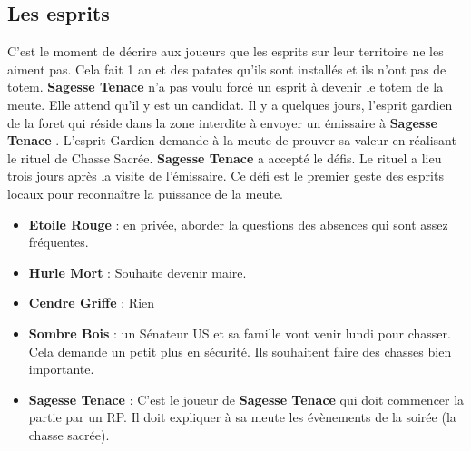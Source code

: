 \documentclass[oneside,12pt]{book}
\newcommand{\Lynn}{\textbf{Etoile Rouge} }
\newcommand{\Jessica}{\textbf{Sagesse Tenace} }
\newcommand{\Luke}{\textbf{Cendre Griffe} }
\newcommand{\Peter}{\textbf{Hurle Mort} }
\newcommand{\Leonard}{\textbf{Sombre Bois} }
\begin{document}
\begin{flushleft}
\subsection{Les esprits}
C'est le moment de décrire aux joueurs que les esprits sur leur territoire ne les aiment pas. Cela fait 1 an et des patates qu'ils sont installés et ils n'ont pas de totem. \Jessica n'a pas voulu forcé un esprit à devenir le totem de la meute. Elle attend qu'il y est un candidat. Il y a quelques jours, l'esprit gardien de la foret qui réside dans la zone interdite à envoyer un émissaire à \Jessica. L'esprit Gardien demande à la meute de prouver sa valeur en réalisant le rituel de Chasse Sacrée. \Jessica a accepté le défis. Le rituel a lieu trois jours après la visite de l'émissaire. Ce défi est le premier geste des esprits locaux pour reconnaître la puissance de la meute. 
\begin{itemize}
\item \Lynn : en privée, aborder la questions des absences qui sont assez fréquentes.
\item \Peter : Souhaite devenir maire.
\item \Luke : Rien
\item \Leonard : un Sénateur US et sa famille vont venir lundi pour chasser. Cela demande un petit plus en sécurité. Ils souhaitent faire des chasses bien importante. 
\item \Jessica : C'est le joueur de \Jessica qui doit commencer la partie par un RP. Il doit expliquer à sa meute les évènements de la soirée (la chasse sacrée). 
\end{itemize}



\end{flushleft}
\end{document}
